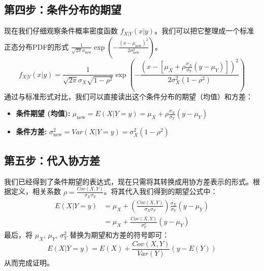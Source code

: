 \documentclass[UTF8]{ctexart}
\begin{document}
\subsection*{第四步：条件分布的期望}

现在我们仔细观察条件概率密度函数 $f_{X|Y}(x|y)$。我们可以把它整理成一个标准正态分布PDF的形式 $\frac{1}{\sqrt{2\pi}\sigma_{\text{new}}}\exp(-\frac{(x-\mu_{\text{new}})^2}{2\sigma_{\text{new}}^2})$。
$$
f_{X|Y}(x|y) = \frac{1}{\sqrt{2\pi}\sigma_X\sqrt{1-\rho^2}} \exp\left( -\frac{\left( x - \left[ \mu_X + \rho\frac{\sigma_X}{\sigma_Y}(y-\mu_Y) \right] \right)^2}{2\sigma_X^2(1-\rho^2)} \right)
$$
通过与标准形式对比，我们可以直接读出这个条件分布的期望（均值）和方差：
\begin{itemize}
    \item \textbf{条件期望 (均值):} $\mu_{\text{new}} = E(X|Y=y) = \mu_X + \rho\frac{\sigma_X}{\sigma_Y}(y-\mu_Y)$
    \item \textbf{条件方差:} $\sigma_{\text{new}}^2 = Var(X|Y=y) = \sigma_X^2(1-\rho^2)$
\end{itemize}

\subsection*{第五步：代入协方差}

我们已经得到了条件期望的表达式，现在只需将其转换成用协方差表示的形式。根据定义，相关系数 $\rho = \frac{Cov(X,Y)}{\sigma_X\sigma_Y}$。将其代入我们得到的期望公式中：
\begin{align*}
E(X|Y=y) &= \mu_X + \left( \frac{Cov(X,Y)}{\sigma_X\sigma_Y} \right) \frac{\sigma_X}{\sigma_Y} (y-\mu_Y) \\
&= \mu_X + \frac{Cov(X,Y)}{\sigma_Y^2} (y-\mu_Y)
\end{align*}
最后，将 $\mu_X$, $\mu_Y$, $\sigma_Y^2$ 替换为期望和方差的符号即可：
$$
E(X|Y=y) = E(X) + \frac{Cov(X,Y)}{Var(Y)}(y - E(Y))
$$
从而完成证明。
\end{document}
